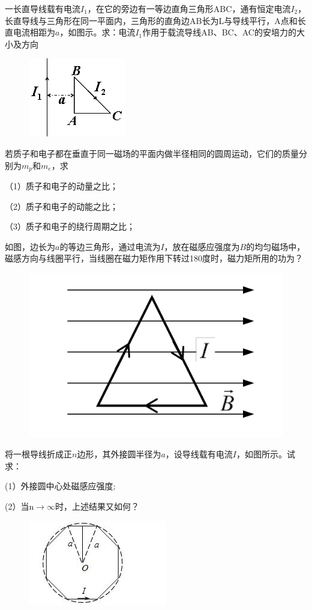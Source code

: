\documentclass[lang=cn,10pt]{elegantbook}
\begin{document}
	\begin{exercise}
		一长直导线载有电流$I_{1}$，在它的旁边有一等边直角三角形ABC，通有恒定电流$I_{2}$，长直导线与三角形在同一平面内，三角形的直角边AB长为L与导线平行，A点和长直电流相距为$a$，如图示。求：电流$I_{1}$作用于载流导线AB、BC、AC的安培力的大小及方向
		
\begin{figure}[H]
	\centering
	\includegraphics[width=0.18\linewidth]{image/图片20}
	\caption{}
	\label{fig:20}
\end{figure}
		
	\end{exercise}
	\begin{exercise}
		若质子和电子都在垂直于同一磁场的平面内做半径相同的圆周运动，它们的质量分别为$m_{p}$和$m_{e}$，求
		
		（1）质子和电子的动量之比；
		
		（2）质子和电子的动能之比；
		
		（3）质子和电子的绕行周期之比；
	\end{exercise}
	\begin{exercise}
		如图，边长为$a$的等边三角形，通过电流为$I$，放在磁感应强度为$B$的均匀磁场中，磁感方向与线圈平行，当线圈在磁力矩作用下转过180度时，磁力矩所用的功为？
		
\begin{figure}[H]
	\centering
	\includegraphics[width=0.18\linewidth]{image/IMG_0435(20231123-215628)}
	\caption{}
	\label{fig:img043520231123-215628}
\end{figure}
	\end{exercise}
	\begin{exercise}
		将一根导线折成正$n$边形，其外接圆半径为$a$，设导线载有电流$I$，如图所示。试求：
		
		(1）外接圆中心处磁感应强度;
		
		(2）当n$\rightarrow \infty$时，上述结果又如何？
		
\begin{figure}[H]
	\centering
	\includegraphics[width=0.18\linewidth]{image/1700748294679}
	\caption{}
	\label{fig:1700748294679}
\end{figure}
		
	\end{exercise}
\end{document}
